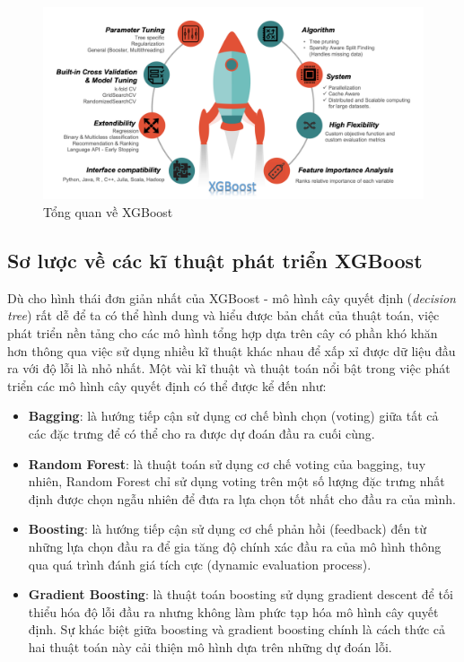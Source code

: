 \documentclass{article}
\begin{document}
\begin{center} 
\begin{figure}[!h]
    \centering
    \includegraphics[scale=0.17]{xgboost-overview.png}
    \caption{Tổng quan về XGBoost \cite{An-xgboost}}
    \label{fig:xgboost-overview}
\end{figure}
\end{center}

\subsection{Sơ lược về các kĩ thuật phát triển XGBoost}
Dù cho hình thái đơn giản nhất của XGBoost - mô hình cây quyết định (\textit{decision tree}) rất dễ để ta có thể hình dung và hiểu được bản chất của thuật toán, việc phát triển nền tảng cho các mô hình tổng hợp dựa trên cây có phần khó khăn hơn thông qua việc sử dụng nhiều kĩ thuật khác nhau để xấp xỉ được dữ liệu đầu ra với độ lỗi là nhỏ nhất. Một vài kĩ thuật và thuật toán nổi bật trong việc phát triển các mô hình cây quyết định có thể được kể đến như:

\begin{itemize}  
    \item \textbf{Bagging}: là hướng tiếp cận sử dụng cơ chế bình chọn (voting) giữa tất cả các đặc trưng để có thể cho ra được dự đoán đầu ra cuối cùng.
    \item \textbf{Random Forest}: là thuật toán sử dụng cơ chế voting của bagging, tuy nhiên, Random Forest \cite{randomforest} chỉ sử dụng voting trên một số lượng đặc trưng nhất định được chọn ngẫu nhiên để đưa ra lựa chọn tốt nhất cho đầu ra của mình.
    \item \textbf{Boosting}: là hướng tiếp cận sử dụng cơ chế phản hồi (feedback) đến từ những lựa chọn đầu ra để gia tăng độ chính xác đầu ra của mô hình thông qua quá trình đánh giá tích cực (dynamic evaluation process).
    \item \textbf{Gradient Boosting}: là thuật toán boosting sử dụng gradient descent để tối thiểu hóa độ lỗi đầu ra nhưng không làm phức tạp hóa mô hình cây quyết định. Sự khác biệt giữa boosting và gradient boosting chính là cách thức cả hai thuật toán này cải thiện mô hình dựa trên những dự đoán lỗi.
\end{itemize}
\end{document}
